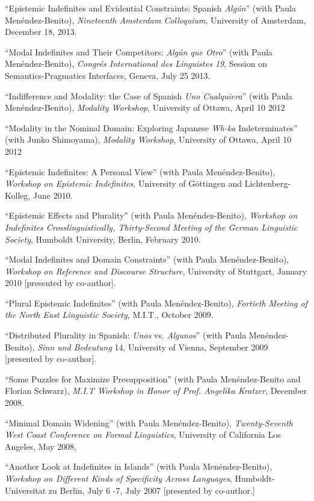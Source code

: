 \documentclass[11pt]{article}
\begin{document}
``Epistemic Indefinites and Evidential Constraints:
Spanish \textit{Alg\'un}''  (with Paula
Men\'endez-Benito), \textit{Nineteenth Amsterdam Colloquium}, University of Amsterdam,
December 18, 2013.

``Modal Indefinites and Their Competitors: \textit{Alg\'un
  que Otro}'' (with Paula
Men\'endez-Benito), \textit{Congr\'es International des Linguistes 19},
Session on Semantics-Pragmatics Interfaces, Geneva, July 25 2013.

``Indifference and Modality: the Case of Spanish \textit{Uno
Cualquiera}'' (with Paula
Men\'endez-Benito), \textit{Modality Workshop}, University of Ottawa, April 10 2012

``Modality in the Nominal Domain: Exploring Japanese
\textit{Wh-ka} Indeterminates'' (with Junko Shimoyama), \textit{Modality Workshop}, University of Ottawa, April 10 2012

``Epistemic Indefinites: A Personal View'' (with Paula
Men\'endez-Benito), \textit{Workshop on Epistemic Indefinites},
University of G\"{o}ttingen and Lichtenberg-Kolleg, June 2010.

``Epistemic Effects and Plurality'' (with Paula
Men\'endez-Benito), \textit{Workshop on Indefinites
  Crosslinguistically, Thirty-Second Meeting of the German Linguistic Society},
Humboldt University, Berlin, February 2010.

``Modal Indefinites and Domain Constraints'' (with Paula
Men\'endez-Benito), \textit{Workshop on Reference and Discourse
  Structure}, University of Stuttgart, January 2010 [presented by co-author].

``Plural Epistemic Indefinites'' (with Paula Men\'endez-Benito), \textit{Fortieth
  Meeting of the North East Linguistic Society}, M.I.T., October 2009.

``Distributed Plurality in Spanish: \textit{Unos} vs. \textit{Algunos}''  (with Paula Men\'endez-Benito), \textit{Sinn und Bedeutung} 14, University of Vienna, September 2009 [presented by co-author].

``Some Puzzles for Maximize Presupposition'' (with
  Paula Men\'endez-Benito and Florian Schwarz), \textit{M.I.T Workshop in
  Honor of Prof. Angelika Kratzer}, December 2008.

``Minimal Domain Widening'' (with Paula Men\'endez-Benito), \textit{Twenty-Seventh West Coast Conference on
  Formal Linguistics}, University of California Los Angeles, May 2008, 

``Another Look at Indefinites in Islands'' (with Paula
  Men\'endez-Benito), \textit{Workshop on Different Kinds of Specificity
  Across Languages}, Humboldt-Universitat zu Berlin, July 6
  -7, July 2007 [presented by co-author.]
\end{document}
